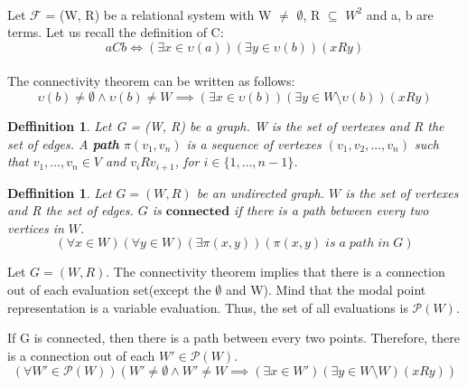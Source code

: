 \documentclass{article}
\newcommand\F{\mathcal{F}}
\newcommand\p{\mathcal{P}}
\newtheorem{defn}[theorem]{Deffinition}
\begin{document}
	\paragraph{} Let $\F$ = (W, R) be a relational system with W $\neq$ $\emptyset$, R $\subseteq$ $W^2$ and a, b are terms. Let us recall the definition of C:
	\begin{equation}
		aCb \iff (\exists x \in \upsilon(a)) (\exists y \in \upsilon(b))(xRy)
	\end{equation}

	\paragraph{} The connectivity theorem can be written as follows:
	\begin{equation}
		\upsilon(b) \neq \emptyset \land \upsilon(b) \neq W \implies (\exists x \in \upsilon(b)) (\exists y \in W \setminus \upsilon(b))(xRy)
	\end{equation}

	\begin{defn}
		Let G = (W, R) be a graph. W is the set of vertexes and R the set of edges. A \textbf{path} $\pi(v_1, v_n)$ is a sequence of vertexes $(v_1, v_2, \dotsc , v_n)$ such that $v_1,\dotsc,v_n \in V$ and $v_iRv_{i+1}$, for $i \in \{1,\dotsc,n-1\}$.
	\end{defn}

	\begin{defn}
		Let $G = (W, R)$ be an undirected graph. $W$ is the set of vertexes and R the set of edges. $G$ is $\mathbf{connected}$ if there is a path between every two vertices in $W$.
		\begin{equation}
			(\forall x \in W)(\forall y \in W)(\exists \pi(x, y)) (\pi(x, y)\;is\;a\;path\;in\;G)
		\end{equation}
	\end{defn}

	Let $G = (W, R)$. The connectivity theorem implies that there is a connection out of each evaluation set(except the $\emptyset$ and W). Mind that the modal point representation is a variable evaluation. Thus, the set of all evaluations is  $\p(W)$.

	If G is connected, then there is a path between every two points. Therefore, there is a connection out of each $W' \in \p(W)$.
		\begin{equation}
			(\forall W' \in \p(W))(W' \neq \emptyset \land W' \neq W \implies(\exists x \in W')(\exists y \in W \setminus W)(xRy))
		\end{equation}
\end{document}

